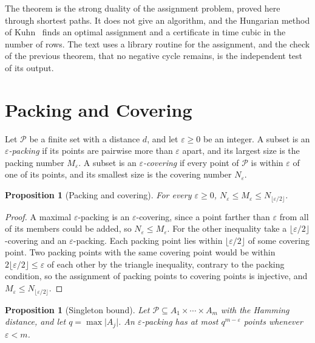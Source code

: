 \documentclass[11pt,twoside,openright]{book}
\theoremstyle{plain}
\newtheorem{proposition}[theorem]{Proposition}
\theoremstyle{definition}
\theoremstyle{remark}
\begin{document}
The theorem is the strong duality of the assignment problem, proved here through shortest paths. It does not give an algorithm, and the Hungarian method of Kuhn~\cite{kuhn1955} finds an optimal assignment and a certificate in time cubic in the number of rows. The text uses a library routine for the assignment, and the check of the previous theorem, that no negative cycle remains, is the independent test of its output.

\section{Packing and Covering}\label{sec:packapp}

Let $\mathcal P$ be a finite set with a distance $d$, and let $\varepsilon\ge0$ be an integer. A subset is an \emph{$\varepsilon$-packing} if its points are pairwise more than $\varepsilon$ apart, and its largest size is the packing number $M_\varepsilon$. A subset is an \emph{$\varepsilon$-covering} if every point of $\mathcal P$ is within $\varepsilon$ of one of its points, and its smallest size is the covering number $N_\varepsilon$.

\begin{proposition}[Packing and covering]\label{prop:pcapp}
For every $\varepsilon\ge0$, $N_\varepsilon\le M_\varepsilon\le N_{\lfloor\varepsilon/2\rfloor}$.
\end{proposition}

\begin{proof}
A maximal $\varepsilon$-packing is an $\varepsilon$-covering, since a point farther than $\varepsilon$ from all of its members could be added, so $N_\varepsilon\le M_\varepsilon$. For the other inequality take a $\lfloor\varepsilon/2\rfloor$-covering and an $\varepsilon$-packing. Each packing point lies within $\lfloor\varepsilon/2\rfloor$ of some covering point. Two packing points with the same covering point would be within $2\lfloor\varepsilon/2\rfloor\le\varepsilon$ of each other by the triangle inequality, contrary to the packing condition, so the assignment of packing points to covering points is injective, and $M_\varepsilon\le N_{\lfloor\varepsilon/2\rfloor}$.
\end{proof}

\begin{proposition}[Singleton bound]\label{prop:singapp}
Let $\mathcal P\subseteq A_1\times\cdots\times A_m$ with the Hamming distance, and let $q=\max\lvert A_j\rvert$. An $\varepsilon$-packing has at most $q^{m-\varepsilon}$ points whenever $\varepsilon<m$.
\end{proposition}
\end{document}
